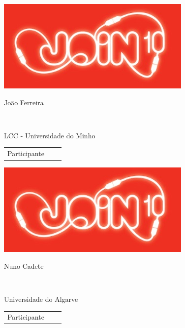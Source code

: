 \documentclass[twocolumn]{article}
\begin{document}
  \newpage 
 
 \begin{minipage}{89mm} 
 \includegraphics{design/logo}\\ 
 
 \addvspace{5mm} 
 
 \begin{center} 
 \huge{João Ferreira} 
 \scriptsize{ 
 \begin{tabular*}{0.75\textwidth}{c} 
 \hline 
 \end{tabular*}}\\ 
LCC - Universidade do Minho
 \end{center} 
 
 \begin{flushright} 
 \begin{tabular}{r l l} 
 \normalsize{Participante} & & 
 \end{tabular} 
 \end{flushright} 
 \end{minipage} 
 
  
 \vspace{12mm} 
 
 \begin{minipage}{89mm} 
 \includegraphics{design/logo}\\ 
 
 \addvspace{5mm} 
 
 \begin{center} 
 \huge{Nuno Cadete} 
 \scriptsize{ 
 \begin{tabular*}{0.75\textwidth}{c} 
 \hline 
 \end{tabular*}}\\ 
Universidade do Algarve
 \end{center} 
 
 \begin{flushright} 
 \begin{tabular}{r l l} 
 \normalsize{Participante} & & 
 \end{tabular} 
 \end{flushright} 
 \end{minipage} 
 
\end{document}
